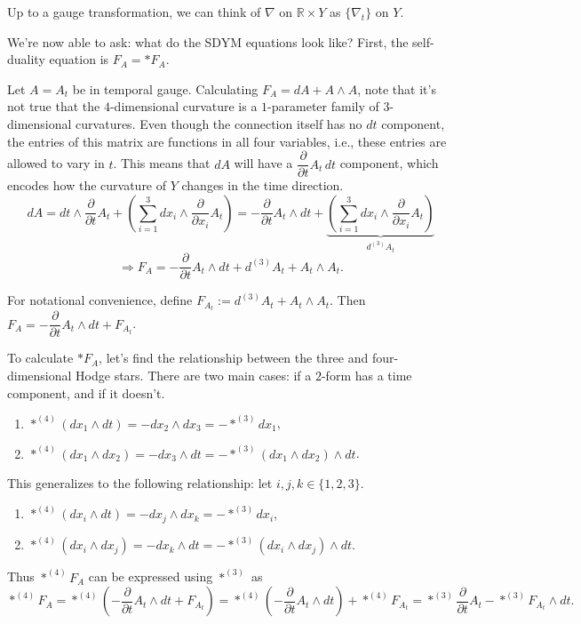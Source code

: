 \documentclass[main]{subfiles}
\begin{document}
Up to a gauge transformation, we can think of $\nabla$ on $\mathbb{R}\times Y$ as $\{\nabla_t\}$ on $Y$.

We're now able to ask: what do the SDYM equations look like? First, the self-duality equation is $F_A = \ast F_A$.

Let $A=A_t$ be in temporal gauge. Calculating $F_A = dA + A\wedge A$, note that it's not true that the $4$-dimensional curvature is a $1$-parameter family of $3$-dimensional curvatures. Even though the connection itself has no $dt$ component, the entries of this matrix are functions in all four variables, i.e., these entries are allowed to vary in $t$. This means that $dA$ will have a $\dfrac{\partial}{\partial t}A_t\, dt$ component, which encodes how the curvature of $Y$ changes in the time direction.
\[
dA = dt\wedge \frac{\partial}{\partial t}A_t + \left(\sum_{i=1}^3 dx_i\wedge \frac{\partial}{\partial x_i}A_t\right) = -\frac{\partial}{\partial t}A_t\wedge dt + \underbrace{\left(\sum_{i=1}^3 dx_i\wedge \frac{\partial}{\partial x_i}A_t\right)}_{d^{(3)}A_t}
\]
\[
\Rightarrow F_A = -\frac{\partial}{\partial t}A_t\wedge dt + d^{(3)}A_t + A_t\wedge A_t.
\]

For notational convenience, define $F_{A_t} := d^{(3)}A_t + A_t\wedge A_t$. Then $F_A = -\dfrac{\partial}{\partial t}A_t\wedge dt + F_{A_t}$.

To calculate $\ast F_A$, let's find the relationship between the three and four-dimensional Hodge stars. There are two main cases: if a $2$-form has a time component, and if it doesn't.
\begin{enumerate}
\item $\ast^{(4)}(dx_1\wedge dt) = -dx_2\wedge dx_3 = -\ast^{(3)}dx_1$,
\item $\ast^{(4)}(dx_1\wedge dx_2) = -dx_3\wedge dt = -\ast^{(3)}(dx_1\wedge dx_2)\wedge dt$.
\end{enumerate}

This generalizes to the following relationship: let $i,j,k\in\{1,2,3\}$.
\begin{enumerate}
\item $\ast^{(4)}(dx_i\wedge dt) = -dx_j\wedge dx_k = -\ast^{(3)}dx_i$,
\item $\ast^{(4)}(dx_i\wedge dx_j) = -dx_k\wedge dt = -\ast^{(3)}(dx_i\wedge dx_j)\wedge dt$.
\end{enumerate}

Thus $\ast^{(4)}F_A$ can be expressed using $\ast^{(3)}$ as
\[
\ast^{(4)}F_A = \ast^{(4)}\left(-\frac{\partial}{\partial t}A_t\wedge dt + F_{A_t}\right) = \ast^{(4)}\left(-\frac{\partial}{\partial t}A_t\wedge dt\right) + \ast^{(4)}F_{A_t} = \ast^{(3)}\frac{\partial}{\partial t}A_t - \ast^{(3)}F_{A_t}\wedge dt.
\]
\end{document}
